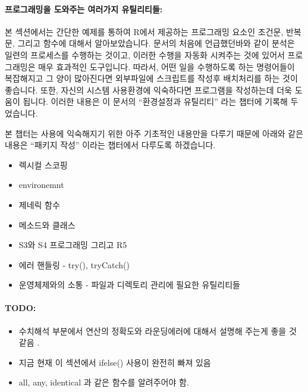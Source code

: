 \paragraph{프로그래밍을 도와주는 여러가지 유틸리티들: } 

본 섹션에서는 간단한 예제를 통하여 R에서 제공하는 프로그래밍 요소인 조건문, 반복문, 그리고 함수에 대해서 알아보았습니다. 
문서의 처음에 언급했던바와 같이 분석은 일련의 프로세스를 수행하는 것이고, 이러한 수행을 자동화 시켜주는 것에 있어서 프로그래밍은 매우 효과적인 도구입니다.
따라서, 어떤 일을 수행하도록 하는 명령어들이 복잡해지고 그 양이 많아진다면 외부파일에 스크립트를 작성후 배치처리를 하는 것이 좋습니다.
또한, 자신의 시스템 사용환경에 익숙하다면 프로그램을 작성하는데 더욱 도움이 됩니다. 
이러한 내용은 이 문서의 ``환경설정과 유틸리티'' 라는 챕터에 기록해 두었습니다. 

본 챕터는 사용에 익숙해지기 위한 아주 기초적인 내용만을 다루기 때문에 아래와 같은 내용은 ``패키지 작성'' 이라는 챕터에서 다루도록 하겠습니다. 

\begin{itemize}
	\item 렉시컬 스코핑 
	\item environemnt
	\item 제네릭 함수 
	\item 메소드와 클래스 
	\item S3와 S4 프로그래밍 그리고 R5
	\item 에러 핸들링 - try(), tryCatch()
	\item 운영체제와의 소통 - 파일과 디렉토리 관리에 필요한 유틸리티들 
\end{itemize}


\paragraph{TODO:}
\begin{itemize}
	\item 수치해석 부분에서 연산의 정확도와 라운딩에러에 대해서 설명해 주는게 좋을 것 같음 .
	\item 지금 현재 이 섹션에서 ifelse() 사용이 완전히 빠져 있음 
	\item all, any, identical 과 같은 함수를 알려주어야 함.  
\end{itemize}

